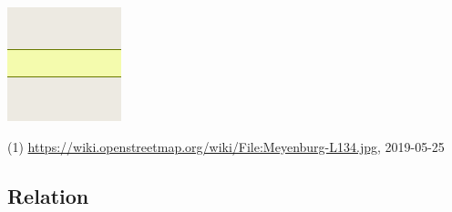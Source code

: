 \documentclass{beamer}
\begin{document}
\begin{frame}
\begin{center}
\begin{minipage}[b][0.6\textheight][c]{0.3\linewidth}
\begin{center}
					\includegraphics[width=0.3\linewidth,height=0.3\textheight,keepaspectratio]{images/Rendering-highway_secondary_neutral.png}\\
					\vspace{0.25cm}
				\end{center}
			\end{minipage}
		\end{center}
		{\tiny (1) \url{https://wiki.openstreetmap.org/wiki/File:Meyenburg-L134.jpg}, 2019-05-25}
	\end{frame}
	
	\subsection{Relation}
	
\end{document}
